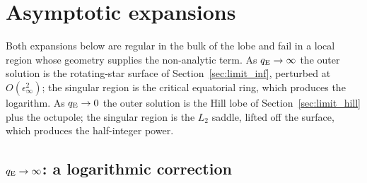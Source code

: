 \documentclass[twocolumn]{aastex702}
\newcommand{\qE}{q_{\rm E}}
\begin{document}
\section{Asymptotic expansions}\label{sec:asym}

Both expansions below are regular in the bulk of the lobe and fail in a local region whose geometry supplies the non-analytic term. As $\qE\to\infty$ the outer solution is the rotating-star surface of Section~\ref{sec:limit_inf}, perturbed at $O(\epsilon_\infty^2)$; the singular region is the critical equatorial ring, which produces the logarithm. As $\qE\to0$ the outer solution is the Hill lobe of Section~\ref{sec:limit_hill} plus the octupole; the singular region is the $L_2$ saddle, lifted off the surface, which produces the half-integer power.

\subsection{$\qE\to\infty$: a logarithmic correction}\label{sec:asym_log}
\end{document}

